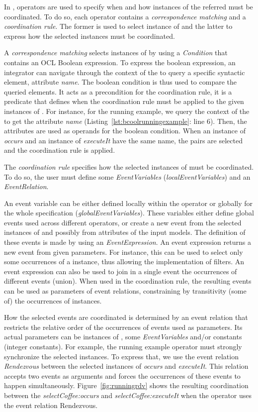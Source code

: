 In \bcool, operators are used to specify when and how instances of the referred \dse must be coordinated. To do so, each operator contains a \emph{correspondence matching} and a \emph{coordination rule}. The former is used to select instance of \dse and the latter to express how the selected instances must be coordinated. 
	
A \emph{correspondence matching} selects instances of \dse by using a \emph{Condition} that contains an OCL Boolean expression. To express the boolean expression, an integrator can navigate through the context of the \dse to query a specific syntactic element, \eg attribute \emph{name}. The boolean condition is thus used to compare the queried elements. It acts as a precondition for the coordination rule, \ie it is a predicate that defines when the coordination rule must be applied to the given instances of \dse. For instance, for the running example, we query the context of the \dse to get the attribute \emph{name} (Listing~\ref{lst:bcoolrunningexample}: line 6). Then, the attributes are used as operands for the boolean condition. When an instance of \dse \emph{occurs} and an instance of \dse \emph{executeIt} have the same name, the pairs are selected and the coordination rule is applied.
	
The \emph{coordination rule} specifies how the selected instances of \dse must be coordinated. To do so, the user must define some \emph{EventVariables} (\emph{localEventVariables}) and an \emph{EventRelation}.   	
	
An event variable can be either defined locally within the operator or globally for the whole specification (\emph{globalEventVariables}). These variables either define global events used across different operators, or create a new event from the selected instances of \dse and possibly from attributes of the input models. The definition of these events is made by using an \emph{EventExpression}. An event expression returns a new event from given parameters. For instance, this can be used to select only some occurrences of a \dse instance, thus allowing the implementation of filters. An event expression can also be used to join in a single event the occurrences of different events (union). When used in the coordination rule, the resulting events can be used as parameters of event relations, constraining by transitivity (some of) the occurrences of \dse instances.
	
How the selected events are coordinated is determined by an event relation that restricts the relative order of the occurrences of events used as parameters. Its actual parameters can be instances of \dse, some \emph{EventVariables} and/or constants (\eg integer constants). For example, the running example operator must strongly synchronize the selected instances. To express that, we use the event relation \emph{Rendezvous} between the selected instances of \dse \emph{occurs} and \emph{executeIt}. This relation accepts two events as arguments and forces the occurrences of these events to happen simultaneously. Figure~\ref{fig:runningrdv} shows the resulting coordination between the \mse \emph{selectCoffee:occurs} and \emph{selectCoffee:executeIt} when the operator uses the event relation Rendezvous.
	
